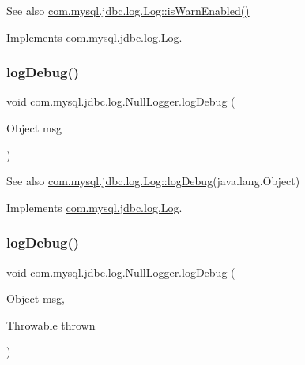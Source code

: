 \begin{DoxySeeAlso}{See also}
\mbox{\hyperlink{interfacecom_1_1mysql_1_1jdbc_1_1log_1_1_log_ae786b79391cf28f119aa7b12226b7e2b}{com.\+mysql.\+jdbc.\+log.\+Log\+::is\+Warn\+Enabled()}} 
\end{DoxySeeAlso}


Implements \mbox{\hyperlink{interfacecom_1_1mysql_1_1jdbc_1_1log_1_1_log_ae786b79391cf28f119aa7b12226b7e2b}{com.\+mysql.\+jdbc.\+log.\+Log}}.

\mbox{\label{classcom_1_1mysql_1_1jdbc_1_1log_1_1_null_logger_a947d1f20badd221aa5aaf15a5944dd56}} 
\subsubsection{\texorpdfstring{log\+Debug()}{logDebug()}\hspace{0.1cm}{\footnotesize\ttfamily [1/2]}}
{\footnotesize\ttfamily void com.\+mysql.\+jdbc.\+log.\+Null\+Logger.\+log\+Debug (\begin{DoxyParamCaption}\item[{Object}]{msg }\end{DoxyParamCaption})}

\begin{DoxySeeAlso}{See also}
\mbox{\hyperlink{interfacecom_1_1mysql_1_1jdbc_1_1log_1_1_log_aa6f1e099156b6a444addba331704c2fe}{com.\+mysql.\+jdbc.\+log.\+Log\+::log\+Debug}}(java.\+lang.\+Object) 
\end{DoxySeeAlso}


Implements \mbox{\hyperlink{interfacecom_1_1mysql_1_1jdbc_1_1log_1_1_log_aa6f1e099156b6a444addba331704c2fe}{com.\+mysql.\+jdbc.\+log.\+Log}}.

\mbox{\label{classcom_1_1mysql_1_1jdbc_1_1log_1_1_null_logger_a2a1e6ac627cdeeb88e0acd8512d42839}} 
\subsubsection{\texorpdfstring{log\+Debug()}{logDebug()}\hspace{0.1cm}{\footnotesize\ttfamily [2/2]}}
{\footnotesize\ttfamily void com.\+mysql.\+jdbc.\+log.\+Null\+Logger.\+log\+Debug (\begin{DoxyParamCaption}\item[{Object}]{msg,  }\item[{Throwable}]{thrown }\end{DoxyParamCaption})}

